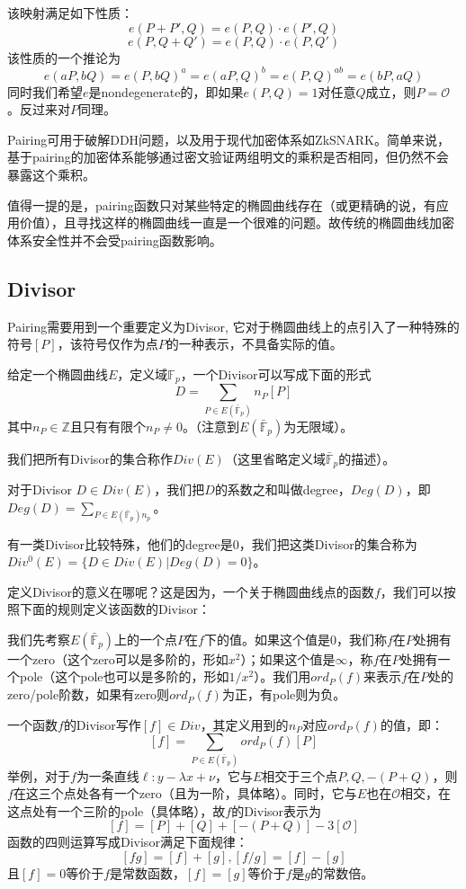 \documentclass[12pt]{article}
\newcommand{\ec}{椭圆曲线}
\newcommand{\oo}{\mathcal{O}}
\newcommand{\fp}{\mathbb{F}_p}
\newcommand{\bfp}{\bar{\mathbb{F}}_p}
\begin{document}
该映射满足如下性质：
$$e(P+P',Q) = e(P,Q)\cdot e(P',Q)$$
$$e(P,Q+Q') = e(P,Q)\cdot e(P,Q')$$
该性质的一个推论为
$$e(aP,bQ) = e(P,bQ)^a=e(aP,Q)^b =e(P,Q)^{ab}=e(bP,aQ)$$
同时我们希望$e$是nondegenerate的，即如果$e(P,Q) = 1$对任意$Q$成立，则$P = \oo$。反过来对$P$同理。

Pairing可用于破解DDH问题，以及用于现代加密体系如ZkSNARK。简单来说，基于pairing的加密体系能够通过密文验证两组明文的乘积是否相同，但仍然不会暴露这个乘积。

值得一提的是，pairing函数只对某些特定的椭圆曲线存在（或更精确的说，有应用价值），且寻找这样的\ec 一直是一个很难的问题。故传统的\ec 加密体系安全性并不会受pairing函数影响。
\subsection{Divisor}
Pairing需要用到一个重要定义为Divisor, 它对于\ec 上的点引入了一种特殊的符号$[P]$，该符号仅作为点$P$的一种表示，不具备实际的值。

给定一个\ec $E$，定义域$\fp$，一个Divisor可以写成下面的形式
$$ D= \sum_{P \in E(\bfp)} n_P[P]$$
其中$n_P \in \mathbb{Z}$且只有有限个$n_P \neq 0$。（注意到$E(\bfp)$为无限域）。

我们把所有Divisor的集合称作$Div(E)$（这里省略定义域$\bfp$的描述）。

对于Divisor $D \in Div(E)$，我们把$D$的系数之和叫做degree，$Deg(D)$，即$Deg(D)=\sum_{P \in E(\bfp) n_p}$。

有一类Divisor比较特殊，他们的degree是0，我们把这类Divisor的集合称为$Div^0(E) = \{D \in Div(E)| Deg(D)=0\}$。

定义Divisor的意义在哪呢？这是因为，一个关于\ec 点的函数$f$，我们可以按照下面的规则定义该函数的Divisor：

我们先考察$E(\bfp)$上的一个点$P$在$f$下的值。如果这个值是0，我们称$f$在$P$处拥有一个zero（这个zero可以是多阶的，形如$x^2$）；如果这个值是$\infty$，称$f$在$P$处拥有一个pole（这个pole也可以是多阶的，形如$1/x^2$）。我们用$ord_P(f)$来表示$f$在$P$处的zero/pole阶数，如果有zero则$ord_P(f)$为正，有pole则为负。

一个函数$f$的Divisor写作$[f] \in Div$，其定义用到的$n_P$对应$ord_P(f)$的值，即：
$$[f] = \sum_{P \in E(\bfp)} ord_P(f)[P]$$
举例，对于$f$为一条直线$\ell : y-\lambda x +\nu$，它与$E$相交于三个点$P,Q,-(P+Q)$，则$f$在这三个点处各有一个zero（且为一阶，具体略）。同时，它与$E$也在$\oo$相交，在这点处有一个三阶的pole（具体略），故$f$的Divisor表示为
$$[f]= [P]+[Q]+[-(P+Q)]-3[\oo]$$
函数的四则运算写成Divisor满足下面规律：
$$[fg]=[f]+[g],[f/g]=[f]-[g]$$
且$[f]=0$等价于$f$是常数函数，$[f]=[g]$等价于$f$是$g$的常数倍。
\end{document}
